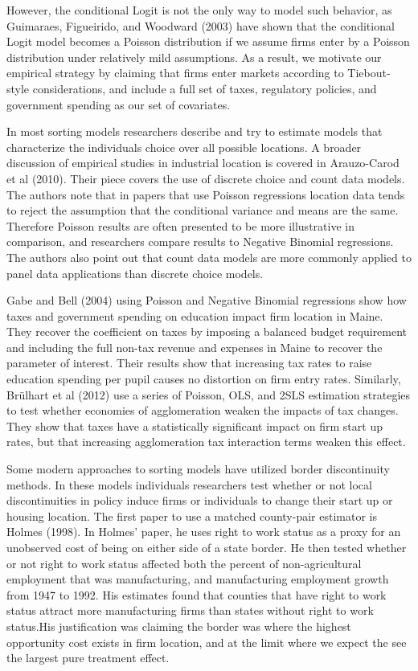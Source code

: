 However, the conditional Logit is not the only way to model such behavior, as Guimaraes, Figueirido, and Woodward (2003) have shown that the conditional Logit model becomes a Poisson distribution if we assume firms enter by a Poisson distribution under relatively mild assumptions. As a result, we motivate our empirical strategy by claiming that firms enter markets according to Tiebout-style considerations, and include a full set of taxes, regulatory policies, and government spending as our set of covariates.

In most sorting models researchers describe and try to estimate models that characterize the individuals choice over all possible locations. A broader discussion of empirical studies in industrial location is covered in Arauzo-Carod et al (2010). Their piece covers the use of discrete choice and count data models. The authors note that in papers that use Poisson regressions location data tends to reject the assumption that the conditional variance and means are the same. Therefore Poisson results are often presented to be more illustrative in comparison, and researchers compare results to Negative Binomial regressions. The authors also point out that count data models are more commonly applied to panel data applications than discrete choice models. 

Gabe and Bell (2004) using Poisson and Negative Binomial regressions show how taxes and government spending on education impact firm location in Maine. They recover the coefficient on taxes by imposing a balanced budget requirement and including the full non-tax revenue and expenses in Maine to recover the parameter of interest. Their results show that increasing tax rates to raise education spending per pupil causes no distortion on firm entry rates. Similarly, Brülhart et al (2012) use a series of Poisson, OLS, and 2SLS estimation strategies to test whether economies of agglomeration weaken the impacts of tax changes. They show that taxes have a statistically significant impact on firm start up rates, but that increasing agglomeration tax interaction terms weaken this effect.

Some modern approaches to sorting models have utilized border discontinuity methods. In these models individuals researchers test whether or not local discontinuities in policy induce firms or individuals to change their start up or housing location. The first paper to use a matched county-pair estimator is Holmes (1998). In Holmes' paper, he uses right to work status as a proxy for an unobserved cost of being on either side of a state border. He then tested whether or not right to work status affected both the percent of non-agricultural employment that was manufacturing, and manufacturing employment growth from 1947 to 1992. His estimates found that counties that have right to work status attract more manufacturing firms than states without right to work status.His justification was claiming the border was where the highest opportunity cost exists in firm location, and at the limit where we expect the see the largest pure treatment effect.

